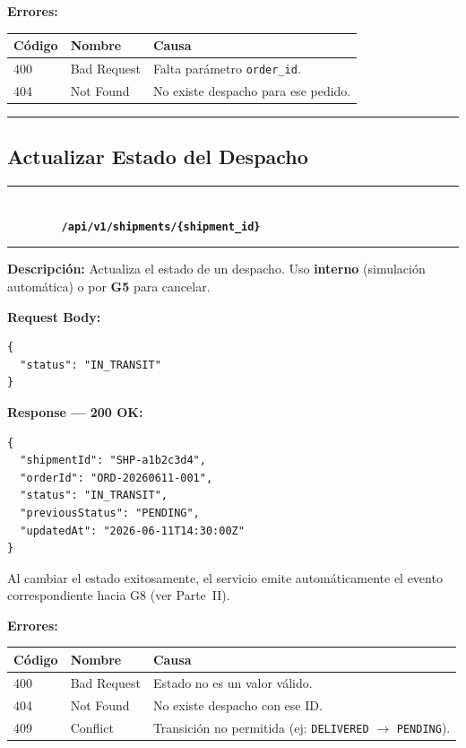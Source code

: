 \documentclass[11pt, a4paper]{article}
\newcommand{\httpmethod}[2]{%
  \colorbox{#1}{\textcolor{white}{\textbf{\small\textsf{#2}}}}%
}
\newcommand{\routeheader}[3]{%
  \noindent\rule{\textwidth}{1.5pt}\\[0.3em]
  \httpmethod{#1}{#2}\;\texttt{\bfseries #3}\\[0.3em]
  \rule{\textwidth}{0.4pt}
  \vspace{0.3cm}
}
\begin{document}
\textbf{Errores:}
\begin{table}[h!]
\small
\begin{tabularx}{\textwidth}{l l X}
  \toprule
  \textbf{Código} & \textbf{Nombre} & \textbf{Causa} \\
  \midrule
  400 & Bad Request & Falta parámetro \texttt{order\_id}. \\
  404 & Not Found   & No existe despacho para ese pedido. \\
  \bottomrule
\end{tabularx}
\end{table}

\noindent\rule{\textwidth}{0.4pt}

\subsection{Actualizar Estado del Despacho}

\routeheader{patch}{PATCH}{/api/v1/shipments/\{shipment\_id\}}

\textbf{Descripción:} Actualiza el estado de un despacho. Uso \textbf{interno}
(simulación automática) o por \textbf{G5} para cancelar.

\vspace{0.3cm}
\textbf{Request Body:}

\begin{lstlisting}
{
  "status": "IN_TRANSIT"
}
\end{lstlisting}

\textbf{Response --- 200 OK:}

\begin{lstlisting}
{
  "shipmentId": "SHP-a1b2c3d4",
  "orderId": "ORD-20260611-001",
  "status": "IN_TRANSIT",
  "previousStatus": "PENDING",
  "updatedAt": "2026-06-11T14:30:00Z"
}
\end{lstlisting}

\begin{infobox}
  Al cambiar el estado exitosamente, el servicio emite automáticamente
  el evento correspondiente hacia G8 (ver Parte~II).
\end{infobox}

\textbf{Errores:}
\begin{table}[h!]
\small
\begin{tabularx}{\textwidth}{l l X}
  \toprule
  \textbf{Código} & \textbf{Nombre} & \textbf{Causa} \\
  \midrule
  400 & Bad Request & Estado no es un valor válido. \\
  404 & Not Found   & No existe despacho con ese ID. \\
  409 & Conflict    & Transición no permitida (ej: \texttt{DELIVERED} $\rightarrow$ \texttt{PENDING}). \\
  \bottomrule
\end{tabularx}
\end{table}
\end{document}
